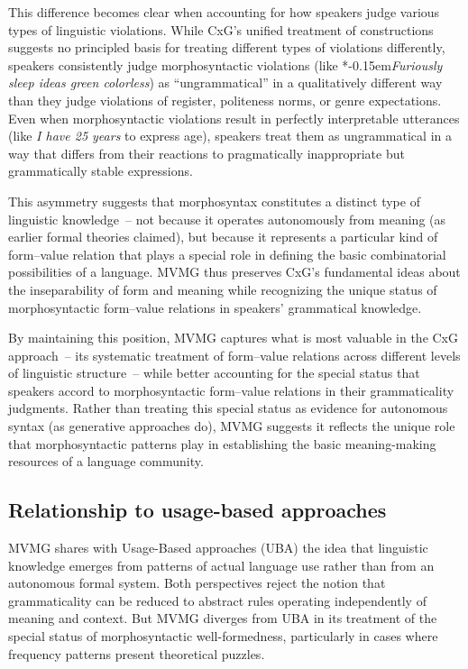 \documentclass[12pt,letterpaper]{article}
\newcommand{\mention}[1]{\textit{#1}}
\newcommand{\judgesep}{\kern-0.15em}
\newcommand{\ungram}[1]{*\judgesep#1}
\begin{document}
This difference becomes clear when accounting for how speakers judge various types of linguistic violations. While CxG's unified treatment of constructions suggests no principled basis for treating different types of violations differently, speakers consistently judge morphosyntactic violations (like \ungram{\mention{Furiously sleep ideas green colorless}}) as \enquote{ungrammatical} in a qualitatively different way than they judge violations of register, politeness norms, or genre expectations. Even when morphosyntactic violations result in perfectly interpretable utterances (like \mention{I have 25 years} to express age), speakers treat them as ungrammatical in a way that differs from their reactions to pragmatically inappropriate but grammatically stable expressions.

This asymmetry suggests that morphosyntax constitutes a distinct type of linguistic knowledge~--  not because it operates autonomously from meaning (as earlier formal theories claimed), but because it represents a particular kind of form--value relation that plays a special role in defining the basic combinatorial possibilities of a language. MVMG thus preserves CxG's fundamental ideas about the inseparability of form and meaning while recognizing the unique status of morphosyntactic form--value relations in speakers' grammatical knowledge.

By maintaining this position, MVMG captures what is most valuable in the CxG approach~--  its systematic treatment of form--value relations across different levels of linguistic structure~--  while better accounting for the special status that speakers accord to morphosyntactic form--value relations in their grammaticality judgments. Rather than treating this special status as evidence for autonomous syntax (as generative approaches do), MVMG suggests it reflects the unique role that morphosyntactic patterns play in establishing the basic meaning-making resources of a language community.

\subsection{Relationship to usage-based approaches}

MVMG shares with Usage-Based approaches (UBA) \autocite{bybee2006, bybee2007frequency, bybee2010} the idea that linguistic knowledge emerges from patterns of actual language use rather than from an autonomous formal system. Both perspectives reject the notion that grammaticality can be reduced to abstract rules operating independently of meaning and context. But MVMG diverges from UBA in its treatment of the special status of morphosyntactic well-formedness, particularly in cases where frequency patterns present theoretical puzzles.
\end{document}
